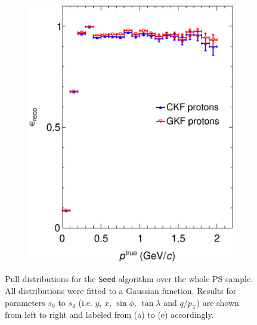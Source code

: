 \begin{figure}[t]
\begin{subfigure}{0.32\textwidth}
         \includegraphics[width=\textwidth]{figures/ch5-KF_NDGAr/FullSample/Integration/EffVSp2212.eps}
         \caption{}
         \label{fig:Eff2212_Integration}
     \end{subfigure}
        \caption{Pull distributions for the \texttt{Seed} algorithm over the whole PS sample. All distributions were fitted to a Gaussian function. Results for parameters $s_0$ to $s_4$ (i.e. $y$, $x$, $\sin\phi$, $\tan\lambda$ and $q/p_{\text{T}}$) are shown from left to right and labeled from (a) to (e) accordingly. }
        \label{fig:Eff_Integration}
\end{figure}

